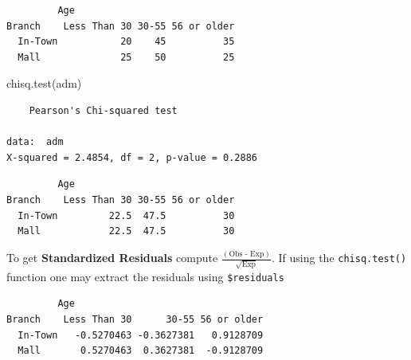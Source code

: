\documentclass[
]{article}
\newenvironment{Shaded}{\begin{snugshade}}{\end{snugshade}}
\newcommand{\CommentTok}[1]{\textcolor[rgb]{0.56,0.35,0.01}{\textit{#1}}}
\newcommand{\DecValTok}[1]{\textcolor[rgb]{0.00,0.00,0.81}{#1}}
\newcommand{\FunctionTok}[1]{\textcolor[rgb]{0.00,0.00,0.00}{#1}}
\newcommand{\NormalTok}[1]{#1}
\newcommand{\SpecialCharTok}[1]{\textcolor[rgb]{0.00,0.00,0.00}{#1}}
\begin{document}
\begin{verbatim}
         Age
Branch    Less Than 30 30-55 56 or older
  In-Town           20    45          35
  Mall              25    50          25
\end{verbatim}

\begin{Shaded}
\begin{Highlighting}[]
\FunctionTok{chisq.test}\NormalTok{(adm)}
\end{Highlighting}
\end{Shaded}

\begin{verbatim}
    Pearson's Chi-squared test

data:  adm
X-squared = 2.4854, df = 2, p-value = 0.2886
\end{verbatim}

\begin{Shaded}
\end{Shaded}

\begin{verbatim}
         Age
Branch    Less Than 30 30-55 56 or older
  In-Town         22.5  47.5          30
  Mall            22.5  47.5          30
\end{verbatim}

To get \textbf{Standardized Residuals} compute \(\frac{(\text{Obs - Exp})}{\sqrt{\text{Exp}}}\). If using the \texttt{chisq.test()} function one may extract the residuals using \texttt{\$residuals}

\begin{Shaded}
\end{Shaded}

\begin{verbatim}
         Age
Branch    Less Than 30      30-55 56 or older
  In-Town   -0.5270463 -0.3627381   0.9128709
  Mall       0.5270463  0.3627381  -0.9128709
\end{verbatim}

\begin{Shaded}
\end{Shaded}
\end{document}
